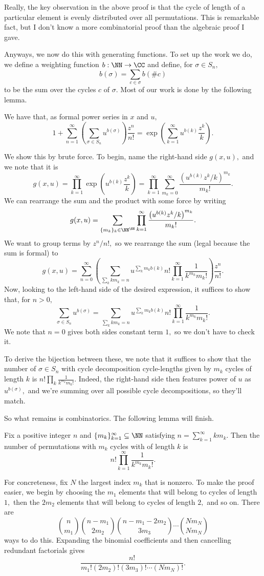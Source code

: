 Really, the key observation in the above proof is that the cycle of length of a particular element is evenly distributed over all permutations. This is remarkable fact, but I don't know a more combinatorial proof than the algebraic proof I gave.

Anyways, we now do this with generating functions. To set up the work we do, we define a weighting function $b:\NN\to\CC$ and define, for $\sigma\in S_n,$
\[b(\sigma)=\sum_{c\in\sigma}b(\#c)\]
to be the sum over the cycles $c$ of $\sigma.$ Most of our work is done by the following lemma.
\begin{proposition}
    We have that, as formal power series in $x$ and $u,$
    \[1+\sum_{n=1}^\infty\left(\sum_{\sigma\in S_n}u^{b(\sigma)}\right)\frac{z^n}{n!}=\exp\left(\sum_{k=1}^\infty u^{b(k)}\frac{z^k}k\right).\]
\end{proposition}
We show this by brute force. To begin, name the right-hand side $g(x,u),$ and we note that it is
\[g(x,u)=\prod_{k=1}^\infty\exp\left(u^{b(k)}\frac{z^k}k\right)=\prod_{k=1}^\infty\sum_{m_k=0}^\infty\frac{\left(u^{b(k)}z^k/k\right)^{m_k}}{m_k!}.\]
We can rearrange the sum and the product with some force by writing
\[g(x,u)=\sum_{\{m_k\}_k\in\NN^\NN}\prod_{k=1}^\infty\frac{\left(u^{b(k)}z^k/k\right)^{m_k}}{m_k!}.\]
We want to group terms by $z^n/n!,$ so we rearrange the sum (legal because the sum is formal) to
\[g(x,u)=\sum_{n=0}^\infty\left(\sum_{\sum_kkm_k=n}u^{\sum_km_kb(k)}n!\prod_{k=1}^\infty\frac1{k^{m_k}m_k!}\right)\frac{z^n}{n!}.\]
Now, looking to the left-hand side of the desired expression, it suffices to show that, for $n>0,$
\[\sum_{\sigma\in S_n}u^{b(\sigma)}=\sum_{\sum_kkm_k=n}u^{\sum_km_kb(k)}n!\prod_{k=1}^\infty\frac1{k^{m_k}m_k!}.\]
We note that $n=0$ gives both sides constant term $1,$ so we don't have to check it.

To derive the bijection between these, we note that it suffices to show that the number of $\sigma\in S_n$ with cycle decomposition cycle-lengths given by $m_k$ cycles of length $k$ is $n!\prod_k\frac1{k^{m_k}m_k!}.$ Indeed, the right-hand side then features power of $u$ as $u^{b(\sigma)},$ and we're summing over all possible cycle decompositions, so they'll match.

So what remains is combinatorics. The following lemma will finish.
\begin{lemma}
    Fix a positive integer $n$ and $\{m_k\}_{k=1}^\infty\subseteq\NN$ satisfying $n=\sum_{k=1}^\infty km_k.$ Then the number of permutations with $m_k$ cycles with of length $k$ is
    \[n!\prod_{k=1}^\infty\frac1{k^{m_k}m_k!}.\]
\end{lemma}
For concreteness, fix $N$ the largest index $m_k$ that is nonzero. To make the proof easier, we begin by choosing the $m_1$ elements that will belong to cycles of length $1,$ then the $2m_2$ elements that will belong to cycles of length $2,$ and so on. There are
\[\binom n{m_1}\binom{n-m_1}{2m_2}\binom{n-m_1-2m_2}{3m_3}\cdots\binom{Nm_N}{Nm_N}\]
ways to do this. Expanding the binomial coefficients and then cancelling redundant factorials gives
\[\frac{n!}{m_1!(2m_2)!(3m_3)!\cdots(Nm_N)!}.\]

